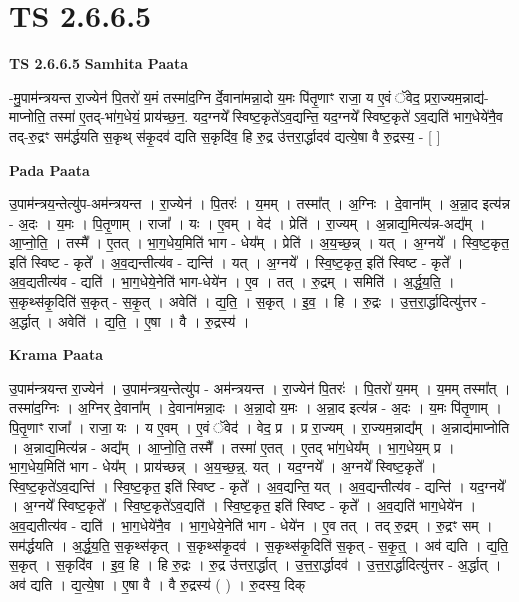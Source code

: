\documentclass[17pt]{extarticle}
\begin{document}
\section{ TS 2.6.6.5 }

\textbf{TS 2.6.6.5 } \newline
\textbf{Samhita Paata} \newline

-मु॒पाम॑न्त्रयन्त रा॒ज्येन॑ पि॒तरो॑ य॒मं तस्मा॑द॒ग्नि र्दे॒वाना॑मन्ना॒दो य॒मः पि॑तृ॒णाꣳ राजा॒ य ए॒वं ॅवेद॒ प्ररा॒ज्यम॒न्नाद्य॑-माप्नोति॒ तस्मा॑ ए॒तद्-भा॑ग॒धेयं॒ प्राय॑च्छ॒न॒. यद॒ग्नये᳚ स्विष्ट॒कृते॑ऽव॒द्यन्ति॒ यद॒ग्नये᳚ स्विष्ट॒कृते॑ ऽव॒द्यति॑ भाग॒धेये॑नै॒व तद्-रु॒द्रꣳ सम॑र्द्धयति स॒कृथ् स॑कृ॒दव॑ द्यति स॒कृदि॑व॒ हि रु॒द्र उ॑त्तरा॒र्द्धादव॑ द्यत्ये॒षा वै रु॒द्रस्य॒ - [  ] \newline

\textbf{Pada Paata} \newline

उ॒पाम॑न्त्रय॒न्तेत्यु॑प-अम॑न्त्रयन्त । रा॒ज्येन॑ । पि॒तरः॑ । य॒मम् । तस्मा᳚त् । अ॒ग्निः । दे॒वाना᳚म् । अ॒न्ना॒द इत्य॑न्न - अ॒दः । य॒मः । पि॒तृ॒णाम् । राजा᳚ । यः । ए॒वम् । वेद॑ । प्रेति॑ । रा॒ज्यम् । अ॒न्नाद्य॒मित्य॑न्न-अद्य᳚म् । आ॒प्नो॒ति॒ । तस्मै᳚ । ए॒तत् । भा॒ग॒धेय॒मिति॑ भाग - धेय᳚म् । प्रेति॑ । अ॒य॒च्छ॒न्न् । यत् । अ॒ग्नये᳚ । स्वि॒ष्ट॒कृत॒ इति॑ स्विष्ट - कृते᳚ । अ॒व॒द्यन्तीत्य॑व - द्यन्ति॑ । यत् । अ॒ग्नये᳚ । स्वि॒ष्ट॒कृत॒ इति॑ स्विष्ट - कृते᳚ । अ॒व॒द्यतीत्य॑व - द्यति॑ । भा॒ग॒धेये॒नेति॑ भाग-धेये॑न । ए॒व । तत् । रु॒द्रम् । समिति॑ । अ॒र्द्ध॒य॒ति॒ । स॒कृथ्स॑कृ॒दिति॑ स॒कृत् - स॒कृ॒त् । अवेति॑ । द्य॒ति॒ । स॒कृत् । इ॒व॒ । हि । रु॒द्रः । उ॒त्त॒रा॒र्द्धादित्यु॑त्तर - अ॒र्द्धात् । अवेति॑ । द्य॒ति॒ । ए॒षा । वै । रु॒द्रस्य॑ ।  \newline


\textbf{Krama Paata} \newline

उ॒पाम॑न्त्रयन्त रा॒ज्येन॑ । उ॒पाम॑न्त्रय॒न्तेत्यु॑प - अम॑न्त्रयन्त । रा॒ज्येन॑ पि॒तरः॑ । पि॒तरो॑ य॒मम् । य॒मम् तस्मा᳚त् । तस्मा॑द॒ग्निः । अ॒ग्निर् दे॒वाना᳚म् । दे॒वाना॑मन्ना॒दः । अ॒न्ना॒दो य॒मः । अ॒न्ना॒द इत्य॑न्न - अ॒दः । य॒मः पि॑तृ॒णाम् । पि॒तृ॒णाꣳ राजा᳚ । राजा॒ यः । य ए॒वम् । ए॒वं ॅवेद॑ । वेद॒ प्र । प्र रा॒ज्यम् । रा॒ज्यम॒न्नाद्य᳚म् । अ॒न्नाद्य॑माप्नोति । अ॒न्नाद्य॒मित्य॑न्न - अद्य᳚म् । आ॒प्नो॒ति॒ तस्मै᳚ । तस्मा॑ ए॒तत् । ए॒तद् भा॑ग॒धेय᳚म् । भा॒ग॒धेय॒म् प्र । भा॒ग॒धेय॒मिति॑ भाग - धेय᳚म् । प्राय॑च्छन्न् । अ॒य॒च्छ॒न्न्॒. यत् । यद॒ग्नये᳚ । अ॒ग्नये᳚ स्विष्ट॒कृते᳚ । स्वि॒ष्ट॒कृते॑ऽव॒द्यन्ति॑ । स्वि॒ष्ट॒कृत॒ इति॑ स्विष्ट - कृते᳚ । अ॒व॒द्यन्ति॒ यत् । अ॒व॒द्यन्तीत्य॑व - द्यन्ति॑ । यद॒ग्नये᳚ । अ॒ग्नये᳚ स्विष्ट॒कृते᳚ । स्वि॒ष्ट॒कृते॑ऽव॒द्यति॑ । स्वि॒ष्ट॒कृत॒ इति॑ स्विष्ट - कृते᳚ । अ॒व॒द्यति॑ भाग॒धेये॑न । अ॒व॒द्यतीत्य॑व - द्यति॑ । भा॒ग॒धेये॑नै॒व । भा॒ग॒धेये॒नेति॑ भाग - धेये॑न । ए॒व तत् । तद् रु॒द्रम् । रु॒द्रꣳ सम् । सम॑र्द्धयति । अ॒र्द्ध॒य॒ति॒ स॒कृथ्स॑कृत् । स॒कृथ्स॑कृ॒दव॑ । स॒कृथ्स॑कृ॒दिति॑ स॒कृत् - स॒कृ॒त्॒ । अव॑ द्यति । द्य॒ति॒ स॒कृत् । स॒कृदि॑व । इ॒व॒ हि । हि रु॒द्रः । रु॒द्र उ॑त्तरा॒र्द्धात् । उ॒त्त॒रा॒र्द्धादव॑ । उ॒त्त॒रा॒र्द्धादित्यु॑त्तर - अ॒र्द्धात् । अव॑ द्यति । द्य॒त्ये॒षा । ए॒षा वै । वै रु॒द्रस्य॑ ( ) । रु॒दस्य॒ दिक् \newline
\end{document}

